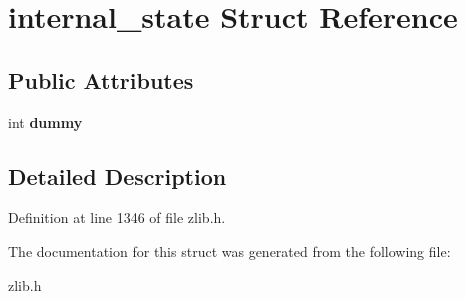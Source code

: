 \hypertarget{structinternal__state}{\section{internal\+\_\+state Struct Reference}
\label{structinternal__state}
}
\subsection*{Public Attributes}
\begin{DoxyCompactItemize}
\item 
\hypertarget{structinternal__state_ab000a3e3c901dd063859521988ad7e52}{int {\bfseries dummy}}\label{structinternal__state_ab000a3e3c901dd063859521988ad7e52}

\end{DoxyCompactItemize}


\subsection{Detailed Description}


Definition at line 1346 of file zlib.\+h.



The documentation for this struct was generated from the following file\+:\begin{DoxyCompactItemize}
\item 
zlib.\+h\end{DoxyCompactItemize}
